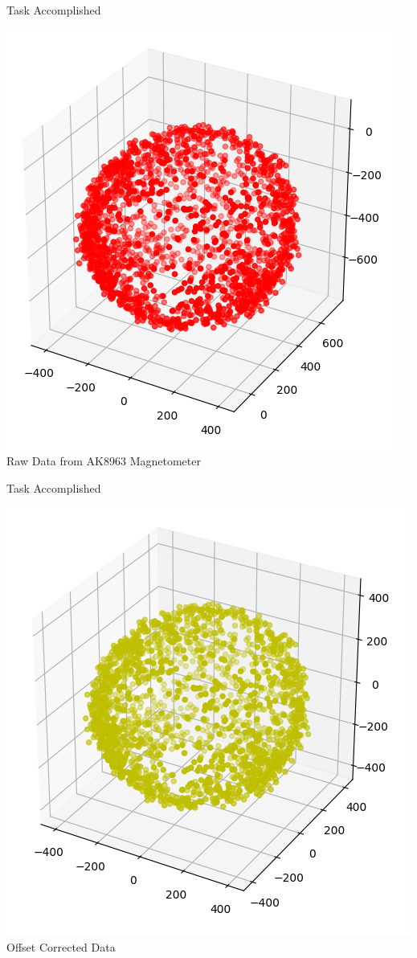 \documentclass[10pt, a4paper]{beamer}
\begin{document}
\begin{frame}{Task Accomplished}
\begin{center}
\includegraphics[scale=0.45]{raw}\\
Raw Data from AK8963 Magnetometer
\end{center}
\end{frame}

\begin{frame}{Task Accomplished}
\begin{center}
\includegraphics[scale=0.45]{offset}\\
Offset Corrected Data
\end{center}
\end{frame}
\end{document}

